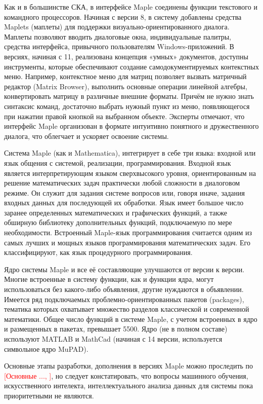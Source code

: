 Как и в большинстве СКА, в интерфейсе Maple соединены функции текстового и командного процессоров. Начиная с версии 8, в систему добавлены средства Maplets (маплеты) для поддержки визуально-ориентированного диалога. Маплеты позволяют вводить диалоговые окна, индивидуальные палитры, средства интерфейса, привычного пользователям Windows-приложений. В версиях, начиная с 11, реализована концепция «умных» документов, доступны инструменты, которые обеспечивают создание самодокументируемых контекстных меню. Например, контекстное меню для матриц позволяет вызвать матричный редактор (Matrix Browser), выполнить основные операции линейной алгебры, конвертировать матрицу в различные внешние форматы. Причём не нужно знать синтаксис команд, достаточно выбрать нужный пункт из меню, появляющегося при нажатии правой кнопкой на выбранном объекте. Эксперты отмечают, что интерфейс Maple организован в формате интуитивно понятного и дружественного диалога, что облегчает и ускоряет освоение системы.

Система Maple (как и Mathematica), интегрирует в себе три языка: входной или язык общения с системой, реализации, программирования.
Входной язык является интерпретирующим языком сверхвысокого уровня, ориентированным на решение математических задач практически любой сложности в диалоговом режиме. Он служит для задания системе вопросов или, говоря иначе, задания входных данных для последующей их обработки. Язык имеет большое число заранее определенных математических и графических функций, а также обширную библиотеку дополнительных функций, подключаемую по мере необходимости. Встроенный Maple-язык программирования считается одним из самых лучших и мощных языков программирования математических задач. Его классифицируют, как язык процедурного программирования.

Ядро системы Maple и все её составляющие улучшаются от версии к версии. Многие встроенные в систему функции, как и функции ядра, могут использоваться без какого-либо объявления, другие нуждаются в объявлении. Имеется ряд подключаемых проблемно-ориентированных пакетов (packages), тематика которых охватывает множество разделов классической и современной математики. Общее число функций в системе Maple, с учетом встроенных в ядро и размещенных в пакетах, превышает 5500. Ядро (не в полном составе) используют MATLAB и MathCad (начиная с 14 версии, используется символьное ядро MuPAD).

Основные этапы разработки, дополнения в версиях Maple можно проследить по \textcolor{red}{[Основные ..., ]}, но следует констатировать, что вопросы машинного обучения, искусственного интелекта, интеллектуального анализа данных для системы пока приоритетными не являются.

